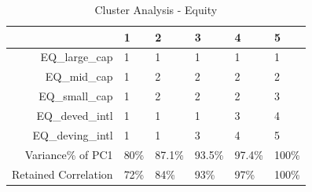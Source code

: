 \begin{longtable}{rlllll}
\caption{Cluster Analysis - Equity} \\ 
  \hline
 & 1 & 2 & 3 & 4 & 5 \\ 
  \hline
EQ\_large\_cap & 1 & 1 & 1 & 1 & 1 \\ 
  EQ\_mid\_cap & 1 & 2 & 2 & 2 & 2 \\ 
  EQ\_small\_cap & 1 & 2 & 2 & 2 & 3 \\ 
  EQ\_deved\_intl & 1 & 1 & 1 & 3 & 4 \\ 
  EQ\_deving\_intl & 1 & 1 & 3 & 4 & 5 \\ 
  Variance\% of PC1 & 80\% & 87.1\% & 93.5\% & 97.4\% & 100\% \\ 
  Retained Correlation & 72\% & 84\% & 93\% & 97\% & 100\% \\ 
   \hline
\hline
\end{longtable}
